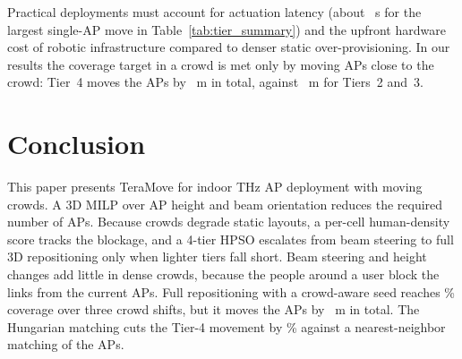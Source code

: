 \documentclass[conference]{IEEEtran}
\begin{document}
	Practical deployments must account for actuation latency (about \TierActFour~s for the largest single-AP move in Table~\ref{tab:tier_summary}) and the upfront hardware cost of robotic infrastructure compared to denser static over-provisioning. In our results the coverage target in a crowd is met only by moving APs close to the crowd: Tier~4 moves the APs by \TierDispFour~m in total, against \TierDispThree~m for Tiers~2 and~3.

	\section{Conclusion}

	This paper presents TeraMove for indoor THz AP deployment with moving crowds. A 3D MILP over AP height and beam orientation reduces the required number of APs. Because crowds degrade static layouts, a per-cell human-density score tracks the blockage, and a 4-tier HPSO escalates from beam steering to full 3D repositioning only when lighter tiers fall short. Beam steering and height changes add little in dense crowds, because the people around a user block the links from the current APs. Full repositioning with a crowd-aware seed reaches \SeqTmCovAvg\% coverage over three crowd shifts, but it moves the APs by \SeqTmDispTot~m in total. The Hungarian matching cuts the Tier-4 movement by \HungSavingPct\% against a nearest-neighbor matching of the APs.
\end{document}
